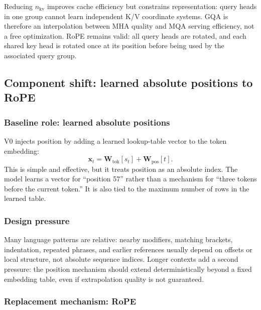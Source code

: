 \documentclass[11pt,a4paper]{article}
\theoremstyle{definition}
\theoremstyle{plain}
\newcommand{\vx}{\bm{x}}
\newcommand{\mW}{\bm{W}}
\begin{document}
Reducing $n_{\mathrm{kv}}$ improves cache efficiency but constrains representation: query heads in one group cannot learn independent K/V coordinate systems. GQA is therefore an interpolation between MHA quality and MQA serving efficiency, not a free optimization. RoPE remains valid: all query heads are rotated, and each shared key head is rotated once at its position before being used by the associated query group.


\subsection{Component shift: learned absolute positions to RoPE}

\subsubsection{Baseline role: learned absolute positions}

V0 injects position by adding a learned lookup-table vector to the token embedding:
\begin{equation}
    \vx_t=\mW_{\mathrm{tok}}[s_t]+\mW_{\mathrm{pos}}[t].
\end{equation}
This is simple and effective, but it treats position as an absolute index. The model learns a vector for ``position 57'' rather than a mechanism for ``three tokens before the current token.'' It is also tied to the maximum number of rows in the learned table.

\subsubsection{Design pressure}

Many language patterns are relative: nearby modifiers, matching brackets, indentation, repeated phrases, and earlier references usually depend on offsets or local structure, not absolute sequence indices. Longer contexts add a second pressure: the position mechanism should extend deterministically beyond a fixed embedding table, even if extrapolation quality is not guaranteed.

\subsubsection{Replacement mechanism: RoPE}
\end{document}
